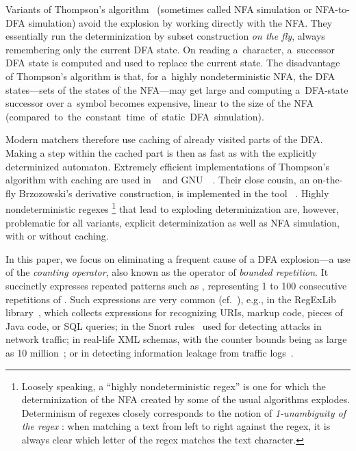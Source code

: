 \documentclass[acmsmall,screen]{acmart}
\begin{document}
Variants of Thompson's algorithm~\cite{thompsonmatching} (sometimes called NFA simulation or NFA-to-DFA simulation)
avoid the explosion by working directly with the NFA. They essentially run the
determinization by subset construction \emph{on the fly}, 
always remembering only the current DFA state.
On reading a~character, a~successor DFA state is computed and used to replace
the current state.
The disadvantage of Thompson's algorithm is that, for a~highly nondeterministic
NFA, the DFA states---sets of the states of the NFA---may get large and computing
a~DFA-state successor over a~symbol becomes expensive, linear to the size of
the NFA \mbox{(compared to the constant time of static DFA simulation).}

Modern matchers therefore use caching of already visited parts of the 
DFA.
Making a step within the cached part is then as fast as with the explicitly determinized automaton.
%
Extremely efficient implementations of Thompson's algorithm with caching are used in
\retwo~\cite{re2} and GNU~\grep~\cite{grep}.
Their close cousin, an on-the-fly Brzozowski's derivative construction, is
implemented in the tool \srm~\cite{VSXW19}.
%
Highly nondeterministic regexes%
\footnote{
Loosely speaking, 
a ``highly nondeterministic regex'' is one for which the determinization of the
NFA created by some of the usual algorithms explodes. Determinism of regexes
closely corresponds to the notion of \emph{1-unambiguity of the regex} \cite{BW98,Hovland09}: when matching a text from left to right against the regex, it is always clear which letter of the regex matches the text character. 
}
 that lead to exploding determinization are, however, problematic for all variants, explicit determinization as well as NFA simulation, with or without caching.
%

In this paper, we focus on eliminating a frequent cause of a DFA explosion---a use of
%
the \emph{counting operator}, also known as the operator of \emph{bounded repetition}. 
%
It succinctly expresses repeated patterns such as ,
representing 1 to 100 consecutive repetitions of .
%
Such expressions are very common (cf.~\cite{cikm15}), e.g., in the RegExLib
library~\cite{regexlib}, which collects expressions for recognizing URIs, markup
code, pieces of Java code, or SQL queries; in the Snort rules~\cite{snort} used
for detecting attacks in network traffic; in real-life XML schemas, with the
counter bounds being as large as 10 million~\cite{cikm15};
%
or in detecting information leakage from traffic
logs~\cite{aplas19}. 
\end{document}
